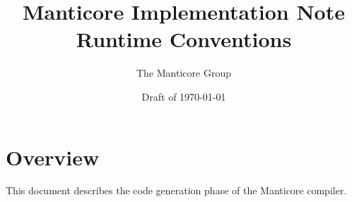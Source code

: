 \documentclass[11pt]{article}
\title{Manticore Implementation Note \\ Runtime Conventions}
\author{The Manticore Group}
\date{Draft of \today}
\begin{document}
\maketitle

\section{Overview}
This document describes the code generation phase of the Manticore compiler.
\end{document}
